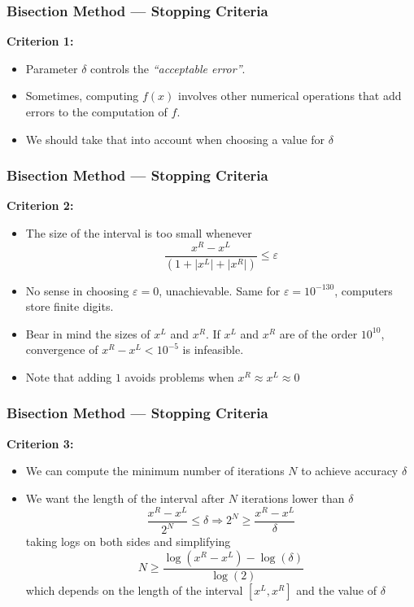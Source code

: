 \documentclass[11pt,xcolor={svgnames},aspectratio=169,usepdftitle=false]{beamer}
\begin{document}
\begin{frame}
  \frametitle{Bisection Method --- Stopping Criteria}
\alert{\textbf{Criterion 1:}}
\begin{itemize}
  \item Parameter $\delta$ controls the \textit{``acceptable error''}.
  \item Sometimes, computing $f(x)$ involves other numerical operations that add errors to the computation of $f$.
  \item We should take that into account when choosing a value for $\delta$
\end{itemize}
\end{frame}


\begin{frame}
  \frametitle{Bisection Method --- Stopping Criteria}
\alert{\textbf{Criterion 2:}}
\begin{itemize}
  \item The size of the interval is too small whenever
  \[
  \frac{x^R - x^L}{(1 + \lvert x^L \rvert + \lvert x^R \rvert)} \leq \varepsilon
  \]
  \item No sense in choosing $\varepsilon = 0$, unachievable. Same for $\varepsilon = 10^{-130}$, computers store finite digits.
  \item Bear in mind the sizes of $x^L$ and $x^R$. {\tiny If $x^L$ and $x^R$ are of the order $10^{10}$, convergence of $x^R-x^L < 10^{-5}$ is infeasible.}
  \item Note that adding $1$ avoids problems when $x^R\approx x^L \approx 0$
\end{itemize}
\end{frame}

\begin{frame}
  \frametitle{Bisection Method --- Stopping Criteria}
\alert{\textbf{Criterion 3:}}
\begin{itemize}
  \item We can compute the minimum number of iterations $N$ to achieve accuracy $\delta$
  \item We want the length of the interval after $N$ iterations lower than $\delta$
  \[
  \frac{x^R - x^L}{2^N} \leq \delta \Rightarrow 2^N \geq \frac{x^R - x^L}{\delta}
  \]
  taking logs on both sides and simplifying
  \[
  N\geq \frac{\log(x^R - x^L) - \log(\delta)}{\log(2)}  
  \]
  which depends on the length of the interval $[x^L, x^R]$ and the value of $\delta$
\end{itemize}
\end{frame}
\end{document}
